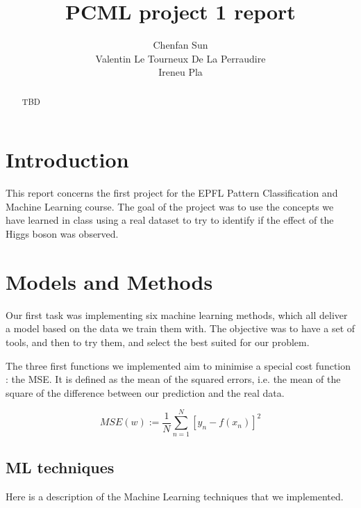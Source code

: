 \documentclass[10pt,conference,compsocconf]{IEEEtran}
\begin{document}
\title{PCML project 1 report}

\author{
  Chenfan Sun\\
  Valentin Le Tourneux De La Perraudire\\
  Ireneu Pla\\
}

\maketitle

\begin{abstract}
TBD
\end{abstract}


\section{Introduction}

This report concerns the first project for the EPFL Pattern Classification and Machine Learning course. The goal of the project was to use the concepts we have learned in class using a real dataset to try to identify if the effect of the Higgs boson was observed.

\section{Models and Methods}

Our first task was implementing six machine learning methods, which all deliver a model based on the data we train them with. The objective was to have a set of tools, and then to try them, and select the best suited for our problem. 

The three first functions we implemented aim to minimise a special cost function : the MSE. It is defined as the mean of the squared errors, i.e. the mean of the square of the difference between our prediction and the real data.

$$MSE(w) := \frac{1}{N}\sum\limits_{n=1}^N {[y_n - f(x_n)]}^2$$

\subsection{ML techniques}

Here is a description of the Machine Learning techniques that we implemented.
\end{document}
